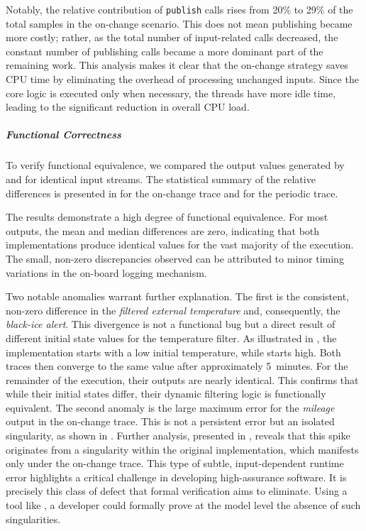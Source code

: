 Notably, the relative contribution of \texttt{publish} calls rises from 20\% to 29\% of the total
samples in the on-change scenario. This does not mean publishing became more costly; rather, as the
total number of input-related calls decreased, the constant number of publishing calls became a more
dominant part of the remaining work. This analysis makes it clear that the on-change strategy saves
CPU time by eliminating the overhead of processing unchanged inputs. Since the core logic is
executed only when necessary, the threads have more idle time, leading to the significant reduction
in overall CPU load.

\subparagraph{Functional Correctness}

To verify functional equivalence, we compared the output values generated by \dispute and \disgrust
for identical input streams. The statistical summary of the relative differences is presented in
 for the on-change trace and
 for the periodic trace.

The results demonstrate a high degree of functional equivalence. For most outputs, the mean and
median differences are zero, indicating that both implementations produce identical values for the
vast majority of the execution. The small, non-zero discrepancies observed can be attributed to
minor timing variations in the on-board logging mechanism.

Two notable anomalies warrant further explanation. The first is the consistent, non-zero difference
in the \emph{filtered external temperature} and, consequently, the \emph{black-ice alert}. This
divergence is not a functional bug but a direct result of different initial state values for the
temperature filter. As illustrated in , the
\dispute implementation starts with a low initial temperature, while \disgrust starts high. Both
traces then converge to the same value after approximately 5~minutes. For the remainder of the
execution, their outputs are nearly identical. This confirms that while their initial states differ,
their dynamic filtering logic is functionally equivalent.
%
The second anomaly is the large maximum error for the \emph{mileage} output in the on-change trace.
This is not a persistent error but an isolated singularity, as shown in
. Further analysis, presented in
, reveals that this spike
originates from a singularity within the original \dispute implementation, which manifests
only under the on-change trace. This type of subtle, input-dependent runtime error highlights a
critical challenge in developing high-assurance software. It is precisely this class of defect that
formal verification aims to eliminate. Using a tool like \GReusot, a developer could formally prove
at the model level the absence of such singularities.

